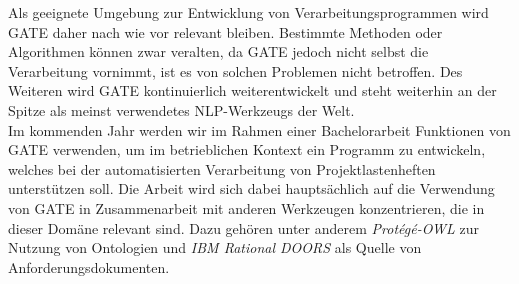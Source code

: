 \documentclass[12pt]{report}
\begin{document}
Als geeignete Umgebung zur Entwicklung von Verarbeitungsprogrammen wird GATE daher nach wie vor relevant bleiben. Bestimmte Methoden oder Algorithmen können zwar veralten, da GATE jedoch nicht selbst die Verarbeitung vornimmt, ist es von solchen Problemen nicht betroffen. Des Weiteren wird GATE kontinuierlich weiterentwickelt und steht weiterhin an der Spitze als meinst verwendetes NLP-Werkzeugs der Welt. \\

Im kommenden Jahr werden wir im Rahmen einer Bachelorarbeit Funktionen von GATE verwenden, um im betrieblichen Kontext ein Programm zu entwickeln, welches bei der automatisierten Verarbeitung von Projektlastenheften unterstützen soll. Die Arbeit wird sich dabei hauptsächlich auf die Verwendung von GATE in Zusammenarbeit mit anderen Werkzeugen konzentrieren, die in dieser Domäne relevant sind. Dazu gehören unter anderem \textit{Protégé-OWL} zur Nutzung von Ontologien und \textit{IBM Rational DOORS} als Quelle von Anforderungsdokumenten.
\end{document}

